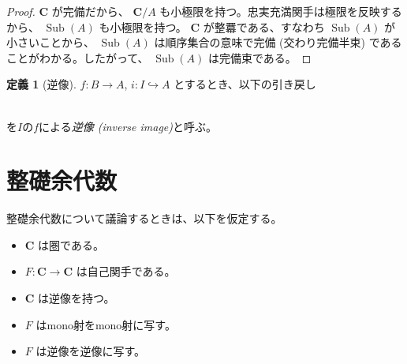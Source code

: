 \documentclass[dvipdfmx,uplatex,papersize,a4paper,10pt]{jsarticle}
\theoremstyle{definition}
\newtheorem{definition}{定義}[section]
\DeclareMathOperator{\Sub}{Sub}
\begin{document}
\begin{proof}
  $\mathbf{C}$ が完備だから、 $\mathbf{C}/A$ も小極限を持つ。忠実充満関手は極限を反映するから、 $\Sub(A)$ も小極限を持つ。 $\mathbf{C}$ が整羃である、すなわち $\Sub(A)$ が小さいことから、 $\Sub(A)$ は順序集合の意味で完備 (交わり完備半束) であることがわかる。したがって、 $\Sub(A)$ は完備束である。
\end{proof}

\begin{definition}[逆像]
  $f \colon B \to A$, $i \colon I \hookrightarrow A$ とするとき、以下の引き戻し \\
   \\
  を$I$の$f$による\emph{逆像 (inverse image)}と呼ぶ。
\end{definition}

\section{整礎余代数}

整礎余代数について議論するときは、以下を仮定する。

\begin{itemize}
  \item $\mathbf{C}$ は圏である。
  \item $F \colon \mathbf{C} \to \mathbf{C}$ は自己関手である。
  \item $\mathbf{C}$ は逆像を持つ。
  \item $F$ はmono射をmono射に写す。
  \item $F$ は逆像を逆像に写す。
\end{itemize}
\end{document}
